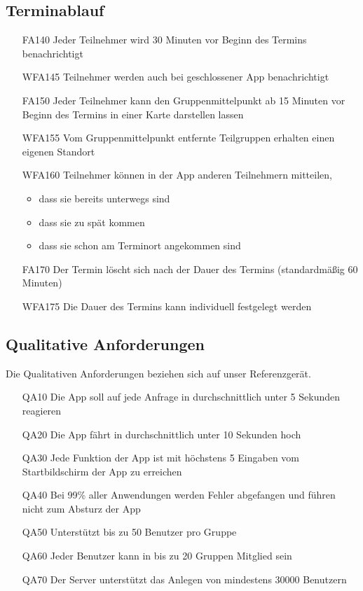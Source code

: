 \documentclass{scrartcl}
\begin{document}
		\subsection{Terminablauf}
		\begin{itemize}
			\hypertarget{FA140}{}
			\item[FA140] Jeder Teilnehmer wird 30 Minuten vor Beginn des Termins benachrichtigt
			\hypertarget{WFA145}{}
			\item[WFA145] Teilnehmer werden auch bei geschlossener App benachrichtigt
			\hypertarget{FA150}{}
			\item[FA150] Jeder Teilnehmer kann den Gruppenmittelpunkt ab 15 Minuten vor Beginn des Termins in einer Karte darstellen lassen
			\hypertarget{WFA155}{}
			\item[WFA155] Vom Gruppenmittelpunkt entfernte Teilgruppen  erhalten einen eigenen Standort 
			\hypertarget{WFA160}{}
			\item[WFA160] Teilnehmer können in der App anderen Teilnehmern mitteilen,
			\begin{itemize}
				\item dass sie bereits unterwegs sind
				\item dass sie zu spät kommen
				\item dass sie schon am Terminort angekommen sind
			\end{itemize}
			\hypertarget{FA170}{}
			\item[FA170] Der Termin löscht sich nach der Dauer des Termins (standardmäßig 60 Minuten)
			\hypertarget{WFA175}{}
			\item[WFA175] Die Dauer des Termins kann individuell festgelegt werden
		\end{itemize}
		
			\subsection{Qualitative Anforderungen}
			Die Qualitativen Anforderungen beziehen sich auf unser Referenzgerät.
			\begin{itemize}
				\item[QA10] Die App soll auf jede Anfrage in durchschnittlich unter 5 Sekunden reagieren
				\item[QA20] Die App fährt in durchschnittlich unter 10 Sekunden hoch
				\item[QA30] Jede Funktion der App ist mit höchstens 5 Eingaben vom Startbildschirm der App zu erreichen
				\item[QA40] Bei 99\% aller Anwendungen werden Fehler abgefangen und führen nicht zum Absturz der App
				\item[QA50] Unterstützt bis zu 50 Benutzer pro Gruppe
				\item[QA60] Jeder Benutzer kann in bis zu 20 Gruppen Mitglied sein
				\item[QA70] Der Server unterstützt das Anlegen von mindestens 30000 Benutzern
			\end{itemize}
	
\end{document}

